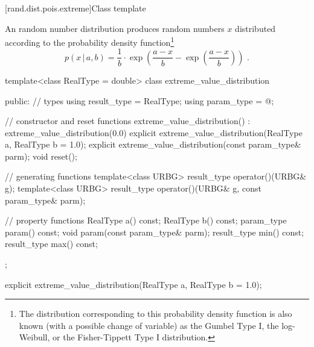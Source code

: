 
[rand.dist.pois.extreme]{Class template }
%
%

\pnum
An  random number distribution
produces random numbers $x$
distributed according to
the probability density function\footnote{The distribution corresponding to
 this probability density function
 is also known
 (with a possible change of variable)
 as the Gumbel Type I,
 the log-Weibull,
 or the Fisher-Tippett Type I
 distribution.}%
%
\[ p(x\,|\,a,b) = \frac{1}{b}
     \cdot \exp\left(\frac{a-x}{b} - \exp\left(\frac{a-x}{b}\right)\right)
     \text{ .} \]

%
\begin{codeblock}
template<class RealType = double>
  class extreme_value_distribution {
  public:
    // types
    using result_type = RealType;
    using param_type  = @\unspec@;

    // constructor and reset functions
    extreme_value_distribution() : extreme_value_distribution(0.0) {}
    explicit extreme_value_distribution(RealType a, RealType b = 1.0);
    explicit extreme_value_distribution(const param_type& parm);
    void reset();

    // generating functions
    template<class URBG>
      result_type operator()(URBG& g);
    template<class URBG>
      result_type operator()(URBG& g, const param_type& parm);

    // property functions
    RealType a() const;
    RealType b() const;
    param_type param() const;
    void param(const param_type& parm);
    result_type min() const;
    result_type max() const;
  };
\end{codeblock}


%
\begin{itemdecl}
explicit extreme_value_distribution(RealType a, RealType b = 1.0);
\end{itemdecl}

